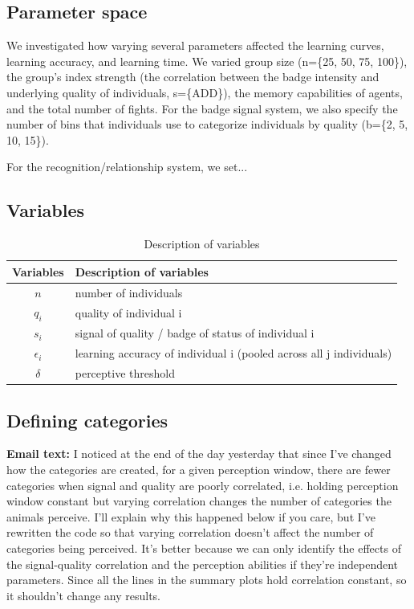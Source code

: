 \subsection*{Parameter space}
We investigated how varying several parameters affected the learning curves, learning accuracy, and learning time. We varied group size (n=\{25, 50, 75, 100\}), the group's index strength (the correlation between the badge intensity and underlying quality of individuals, s=\{ADD\}), the memory capabilities of agents, and the total number of fights. For the badge signal system, we also specify the number of bins that individuals use to categorize individuals by quality (b=\{2, 5, 10, 15\}). 

For the recognition/relationship system, we set...%


\subsection*{Variables}

\begin {table}[h]
\caption {Description of variables} \label{tab:vars} 
\begin{tabular}{cl}
\toprule
 Variables & Description of variables \\
\midrule
$n$ & number of individuals \\ 
 $q_i$ & quality of individual i \\ 
 $s_i$ & signal of quality / badge of status of individual i \\ 
 $\epsilon_i$ & learning accuracy of individual i (pooled across all j individuals) \\
 $\delta$ & perceptive threshold \\
 
\bottomrule
\end{tabular}
\end {table}

\subsection*{Defining categories}
\textbf{Email text: }I noticed at the end of the day yesterday that since I've changed how the categories are created, for a given perception window, there are fewer categories when signal and quality are poorly correlated, i.e. holding perception window constant but varying correlation changes the number of categories the animals perceive. I'll explain why this happened below if you care, but I've rewritten the code so that varying correlation doesn't affect the number of categories being perceived. It's better because we can only identify the effects of the signal-quality correlation and the perception abilities if they're independent parameters. Since all the lines in the summary plots hold correlation constant, so it shouldn't change any results. 

